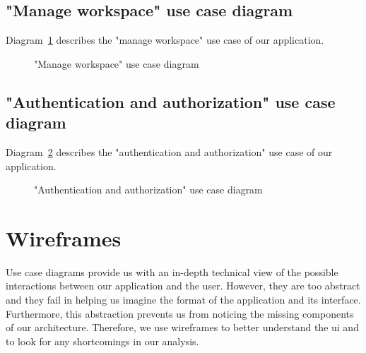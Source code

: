\subsection{"Manage workspace" use case diagram}
Diagram~\ref{fig:spaces-use-case-diagram} describes the "manage workspace" use case of our application.

\begin{figure}[H]
	\centerfloat

	\caption{"Manage workspace" use case diagram}
	\label{fig:spaces-use-case-diagram}
\end{figure}

\subsection{"Authentication and authorization" use case diagram}
Diagram~\ref{fig:auth-use-case-diagram} describes the "authentication and authorization" use case of our application.

\begin{figure}[H]
	\centerfloat

	\caption{"Authentication and authorization" use case diagram}
	\label{fig:auth-use-case-diagram}
\end{figure}






\section{Wireframes}
Use case diagrams provide us with an in-depth technical view of the possible interactions between our application and the user.
However, they are too abstract and they fail in helping us imagine the format of the application and its interface.
Furthermore, this abstraction prevents us from noticing the missing components of our architecture.
Therefore, we use wireframes to better understand the \acrfull{ui} and to look for any shortcomings in our analysis.

